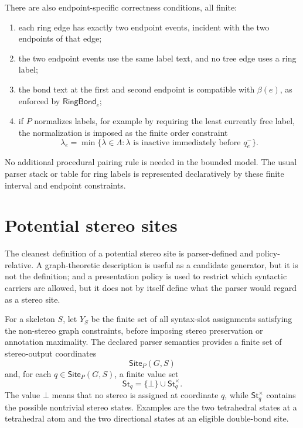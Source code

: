 \documentclass[10pt,a4paper]{article}
\newcommand{\None}{\bot}
\newcommand{\St}{\mathsf{St}}
\newcommand{\Site}{\mathsf{Site}}
\theoremstyle{definition}
\theoremstyle{remark}
\begin{document}
	There are also endpoint-specific correctness conditions, all finite:
	\begin{enumerate}[label=\textup{(R\arabic*)},leftmargin=2.5em]
		\item each ring edge has exactly two endpoint events, incident with the two
		endpoints of that edge;
		\item the two endpoint events use the same label text, and no tree edge uses a
		ring label;
		\item the bond text at the first and second endpoint is compatible with
		\(\beta(e)\), as enforced by \(\mathsf{RingBond}_e\);
		\item if \(P\) normalizes labels, for example by requiring the least currently
		free label, the normalization is imposed as the finite order constraint
		\[
		\lambda_e
		=\min\{\lambda\in\Lambda:
		\lambda\text{ is inactive immediately before }q_e^-\} .
		\]
	\end{enumerate}
	No additional procedural pairing rule is needed in the bounded model.  The usual
	parser stack or table for ring labels is represented declaratively by these
	finite interval and endpoint constraints.

	\section{Potential stereo sites}
	\label{s:potential-sites}

	The cleanest definition of a potential stereo site is parser-defined and
	policy-relative.  A graph-theoretic description is useful as a candidate
	generator, but it is not the definition; and a presentation policy is used to
	restrict which syntactic carriers are allowed, but it does not by itself define
	what the parser would regard as a stereo site.

	For a skeleton \(S\), let \(Y_S\) be the finite set of all syntax-slot
	assignments satisfying the non-stereo graph constraints, before imposing stereo
	preservation or annotation maximality.  The declared parser semantics provides a
	finite set of stereo-output coordinates
	\[
	\Site_P(G,S)
	\]
	and, for each \(q\in\Site_P(G,S)\), a finite value set
	\[
	\St_q=\{\None\}\cup \St_q^\times .
	\]
	The value \(\None\) means that no stereo is assigned at coordinate \(q\), while
	\(\St_q^\times\) contains the possible nontrivial stereo states.  Examples are
	the two tetrahedral states at a tetrahedral atom and the two directional states
	at an eligible double-bond site.
\end{document}
